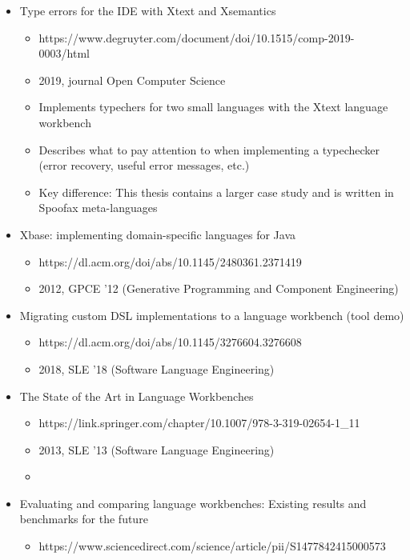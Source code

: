     \begin{itemize}
      \item Type errors for the IDE with Xtext and Xsemantics
      \begin{itemize}
        \item https://www.degruyter.com/document/doi/10.1515/comp-2019-0003/html
        \item 2019, journal Open Computer Science
        \item Implements typechers for two small languages with the Xtext language workbench
        \item Describes what to pay attention to when implementing a typechecker (error recovery, useful error messages, etc.)
        \item Key difference: This thesis contains a larger case study and is written in Spoofax meta-languages
      \end{itemize}
      \item Xbase: implementing domain-specific languages for Java
      \begin{itemize}
        \item https://dl.acm.org/doi/abs/10.1145/2480361.2371419
        \item 2012, GPCE '12 (Generative Programming and Component Engineering)
      \end{itemize}
      \item Migrating custom DSL implementations to a language workbench (tool demo)
      \begin{itemize}
        \item https://dl.acm.org/doi/abs/10.1145/3276604.3276608
        \item 2018, SLE '18 (Software Language Engineering)
      \end{itemize}
      \item The State of the Art in Language Workbenches
      \begin{itemize}
        \item https://link.springer.com/chapter/10.1007/978-3-319-02654-1\_11
        \item 2013, SLE '13 (Software Language Engineering)
        \item 
      \end{itemize}
      \item Evaluating and comparing language workbenches: Existing results and benchmarks for the future
      \begin{itemize}
        \item https://www.sciencedirect.com/science/article/pii/S1477842415000573

\end{itemize}
\end{itemize}
